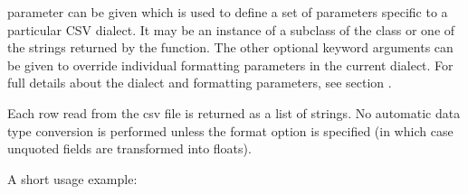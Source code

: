 \documentclass[letterpaper,10pt,english]{sphinxmanual}
\begin{document}
\begin{fulllineitems}
 parameter can be given which is used to define a set of parameters
specific to a particular CSV dialect.  It may be an instance of a subclass of
the {\hyperref[\detokenize{csv:csv.Dialect}]{}} class or one of the strings returned by the
{\hyperref[\detokenize{csv:csv.list_dialects}]{}} function.  The other optional  keyword arguments
can be given to override individual formatting parameters in the current
dialect.  For full details about the dialect and formatting parameters, see
section {\hyperref[\detokenize{csv:csv-fmt-params}]{}}.

Each row read from the csv file is returned as a list of strings.  No
automatic data type conversion is performed unless the  format
option is specified (in which case unquoted fields are transformed into floats).

A short usage example:

\begin{sphinxVerbatim}[commandchars=\\\{\}]
 
    
        
       
        
\end{sphinxVerbatim}

\end{fulllineitems}

\end{document}
